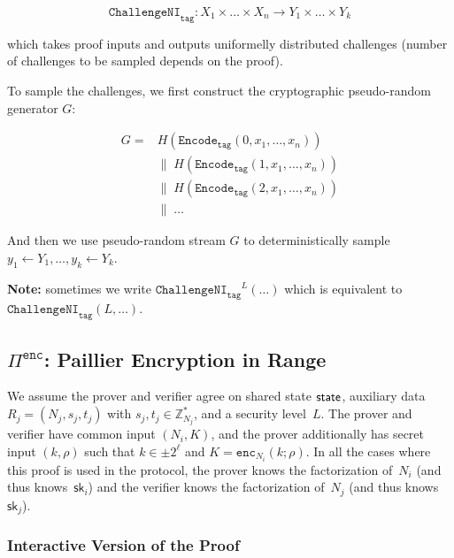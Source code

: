 \documentclass[11pt]{article}
\def\state{{\sf state}}
\newcommand{\enc}{\ensuremath{\mathtt{enc}}}
\newcommand{\proof}[1]{\ensuremath{\Pi^{\mathtt{#1}}}}
\newcommand{\challengeni}[1]{\ensuremath{\mathtt{ChallengeNI}_{\mathtt{#1}}}}
\newcommand{\Encode}[1][]{\ensuremath{\mathtt{Encode}_{\mathtt{#1}}}}
\newcommand{\sk}{\textsf{sk}}
\newcommand{\Z}{\mathbb{Z}}
\newcommand{\?}[1]{\stackrel{?}{#1}}
\begin{document}
$$\challengeni{tag} : X_1 \times \dots \times X_n \to Y_1 \times \dots \times Y_k$$

which takes proof inputs and outputs uniformelly distributed challenges (number of challenges to be
sampled depends on the proof).

To sample the challenges, we first construct the cryptographic pseudo-random generator $G$:

\begin{align*}
G = & H(\Encode[tag](0, x_1, \dots, x_n)) \\
    & \| \; H(\Encode[tag](1, x_1, \dots, x_n)) \\
    & \| \; H(\Encode[tag](2, x_1, \dots, x_n)) \\
    & \| \; \dots
\end{align*}

And then we use pseudo-random stream $G$ to deterministically sample $y_1 \gets Y_1, \dots, y_k \gets Y_k$.

{\bf Note:} sometimes we write $\challengeni{tag}^L(\dots)$ which is equivalent to $\challengeni{tag}(L, \dots)$.

\subsection{$\proof{enc}$: Paillier Encryption in Range}

We assume the prover and verifier agree on shared state $\state$, auxiliary data $R_j = (N_j, s_j, t_j)$ with $s_j, t_j \in \Z^*_{N_j}$, and a security level~$L$. 
The prover and verifier have common input $(N_i, K)$, and the prover additionally has 
secret input $(k, \rho)$ such that $k \in \pm 2^\ell$ and $K = \enc_{N_i}(k; \rho)$.
In all the cases where this proof is used in the protocol, the prover knows the factorization of~$N_i$ (and thus knows~$\sk_i$) and the verifier knows the factorization of~$N_j$ (and thus knows $\sk_j$).

\subsubsection{Interactive Version of the Proof}
\end{document}

